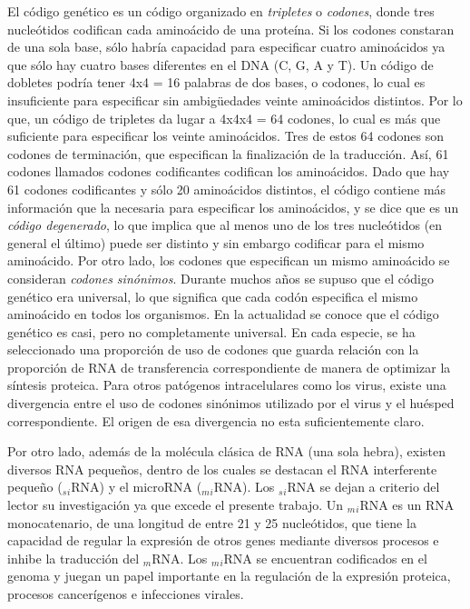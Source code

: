 \par El código genético es un código organizado en \emph{tripletes} o \emph{codones}, donde tres nucleótidos codifican cada aminoácido de una proteína.
Si los codones constaran de una sola base, sólo habría capacidad para especificar cuatro aminoácidos ya que sólo hay cuatro bases diferentes en el DNA (C, G, A y T). Un código de dobletes podría tener 4x4 = 16 palabras de dos bases, o codones, lo cual es insuficiente para especificar sin ambigüedades veinte aminoácidos distintos. Por lo que, un código de tripletes da lugar a 4x4x4 = 64 codones, lo cual es más que suficiente para especificar los veinte aminoácidos\cite{genetica}. Tres de estos 64 codones son codones de terminación, que especifican la finalización de la traducción. Así, 61 codones llamados codones codificantes codifican los aminoácidos. Dado que hay 61 codones codificantes y sólo 20 aminoácidos distintos, el código contiene más información que la necesaria para especificar los aminoácidos, y se dice que es un \emph{código degenerado}, lo que implica que al menos uno de los tres nucleótidos (en general el último) puede ser distinto y sin embargo codificar para el mismo aminoácido\cite{genetica2}. Por otro lado, los codones que especifican un mismo aminoácido se consideran \emph{codones sinónimos}. Durante muchos años se supuso que el código genético era universal, lo que significa que cada codón especifica el mismo aminoácido en todos los organismos. En la actualidad se conoce que el código genético es casi, pero no completamente universal. En cada especie, se ha seleccionado una proporción de uso de codones que guarda relación con la proporción de RNA de transferencia correspondiente de manera de optimizar la síntesis proteica. Para otros patógenos intracelulares como los virus, existe una divergencia entre el uso de codones sinónimos\cite{holme} utilizado por el virus y el huésped correspondiente. El origen de esa divergencia no esta suficientemente claro.

\par Por otro lado, además de la molécula clásica de RNA (una sola hebra), existen diversos RNA pequeños, dentro de los cuales se destacan el RNA interferente pequeño ($_s$$_i$RNA) y el microRNA ($_m$$_i$RNA). Los $_s$$_i$RNA se dejan a criterio del lector su investigación ya que excede el presente trabajo.
Un $_m$$_i$RNA \cite{miRNA}\cite{miRNA2} es un RNA monocatenario, de una longitud de entre 21 y 25 nucleótidos, que tiene la capacidad de regular la expresión de otros genes mediante diversos procesos e inhibe la traducción del $_m$RNA. Los $_m$$_i$RNA se encuentran codificados en el genoma y juegan un papel importante en la regulación de la expresión proteica, procesos cancerígenos e infecciones virales. 

